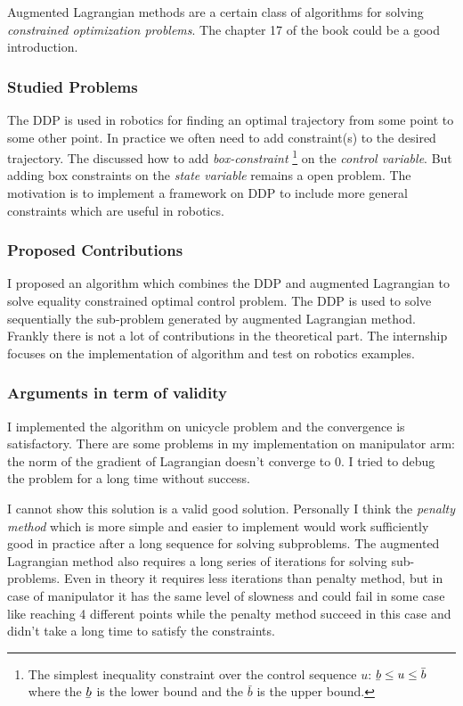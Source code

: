\documentclass{report}
\begin{document}
Augmented Lagrangian methods are a certain class of algorithms for solving \emph{constrained optimization problems}. The chapter 17 of the book \cite{NoceWrig06} could be a good introduction. 

\subsubsection{Studied Problems}
The DDP is used in robotics for finding an optimal trajectory from some point to some other point. In practice we often need to add constraint(s) to the desired trajectory. The \cite{TassaICRA14} discussed how to add \emph{box-constraint} \footnote{The simplest inequality constraint over the control sequence $u$: $\underaccent{\bar}{b} \le u \le \bar{b}$ where the $\underaccent{\bar}{b}$ is the lower bound and the $\bar{b}$ is the upper bound.} on the \emph{control variable}. But adding box constraints on the \emph{state variable} remains a open problem. The motivation is to implement a framework on DDP to include more general constraints which are useful in robotics.

\subsubsection{Proposed Contributions}
I proposed an algorithm which combines the DDP and augmented Lagrangian to solve equality constrained optimal control problem. The DDP is used to solve sequentially the sub-problem generated by augmented Lagrangian method. Frankly there is not a lot of contributions in the theoretical part. The internship focuses on the implementation of algorithm and test on robotics examples.

\subsubsection{Arguments in term of validity}
I implemented the algorithm on unicycle problem and the convergence is satisfactory. There are some problems in my implementation on manipulator arm: the norm of the gradient of Lagrangian doesn't converge to 0. I tried to debug the problem for a long time without success. 

I cannot show this solution is a valid good solution. Personally I think the \emph{penalty method} which is more simple and easier to implement would work sufficiently good in practice after a long sequence for solving subproblems. The augmented Lagrangian method also requires a long series of iterations for solving sub-problems. Even in theory it requires less iterations than penalty method, but in case of manipulator it has the same level of slowness and could fail in some case like reaching 4 different points while the penalty method succeed in this case and didn't take a long time to satisfy the constraints.
\end{document}
